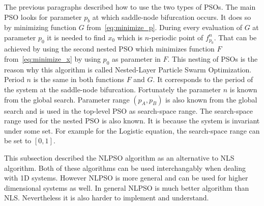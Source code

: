 \par
The previous paragraphs described how to use the two types of PSOs.
The main PSO looks for parameter $p_b$ at which saddle-node bifurcation occurs.
It does so by minimizing function $G$ from~\ref{eq:minimize_p}.
During every evaluation of $G$ at parameter $p_0$ it is needed to find $x_0$ which is $n$-periodic point of $f^{n}_{p_0}$.
That can be achieved by using the second nested PSO which minimizes function $F$ from~\ref{eq:minimize_x} by using $p_0$ as parameter in $F$.
This nesting of PSOs is the reason why this algorithm is called Nested-Layer Particle Swarm Optimization.
Period $n$ is the same in both functions $F$ and $G$.
It corresponds to the period of the system at the saddle-node bifurcation.
Fortunately the parameter $n$ is known from the global search.
Parameter range $(p_A, p_B)$ is also known from the global search and is used in the top-level PSO as search-space range.
The search-space range used for the nested PSO is also known.
It is because the system is invariant under some set.
For example for the Logistic equation, the search-space range can be set to $[0, 1]$.
\par
This subsection described the NLPSO algorithm as an alternative to NLS algorithm.
Both of these algorithms can be used interchangably when dealing with 1D systems.
However NLPSO is more general and can be used for higher dimensional systems as well.
In general NLPSO is much better algorithm than NLS.
Nevertheless it is also harder to implement and understand.

